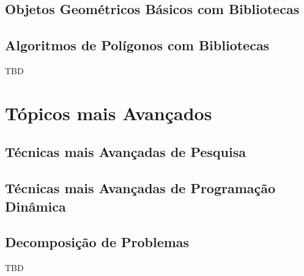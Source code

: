 \documentclass[11pt]{scrartcl}
\begin{document}
\subsection{Objetos Geométricos Básicos com Bibliotecas}

\subsection{Algoritmos de Polígonos com Bibliotecas}

TBD


\section{Tópicos mais Avançados}

\subsection{Técnicas mais Avançadas de Pesquisa}

\subsection{Técnicas mais Avançadas de Programação Dinâmica}

\subsection{Decomposição de Problemas}

TBD
\end{document}
